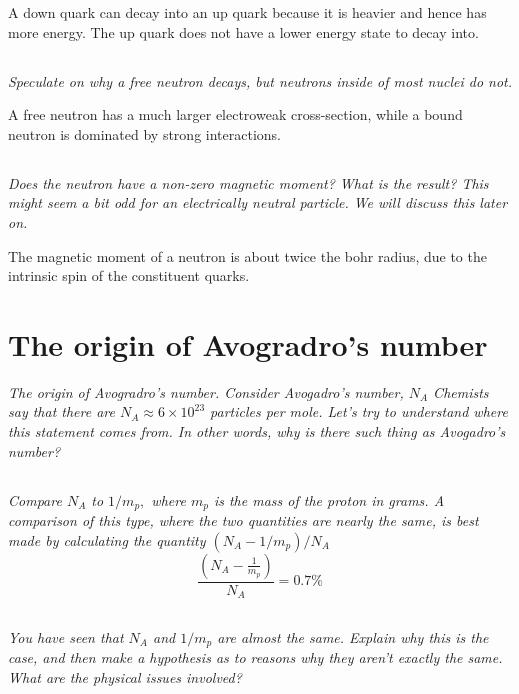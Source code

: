\documentclass[12pt, letterpaper]{article}
\begin{document}
A down quark can decay into an up quark because it is heavier and hence has more energy. The up quark does not have a lower energy state to decay into. 

\subsection{}
\textit{Speculate on why a free neutron decays, but neutrons inside of most nuclei do not.}

A free neutron has a much larger electroweak cross-section, while a bound neutron is dominated by strong interactions.

\subsection{}
\textit{Does the neutron have a non-zero magnetic moment? What is the result? This might seem a bit odd for an electrically neutral particle. We will discuss this later on.}

The magnetic moment of a neutron is about twice the bohr radius, due to the intrinsic spin of the constituent quarks. 

\section{The origin of Avogradro’s number}
\textit{The origin of Avogradro's number. Consider Avogadro's number, $N_{A}$ Chemists say that there are $N_{A} \approx 6 \times 10^{23}$ particles per mole. Let's try to understand where this statement comes from. In other words, why is there such thing as Avogadro's number?}

\subsection{}
\textit{Compare $N_{A}$ to $1 / m_{p},$ where $m_{p}$ is the mass of the proton in grams. A comparison of this type, where the two quantities are nearly the same, is best made by calculating the quantity $\left(N_{A}-1 / m_{p}\right) / N_{A}$}
$$
\frac{\left(N_{A}-\frac{1}{m_{p}}\right)}{N_{A}}=0.7 \%
$$


\subsection{}
\textit{You have seen that $N_{A}$ and $1 / m_{p}$ are almost the same. Explain why this is the case, and then make a hypothesis as to reasons why they aren't exactly the same. What are the physical issues involved?}
\end{document}
